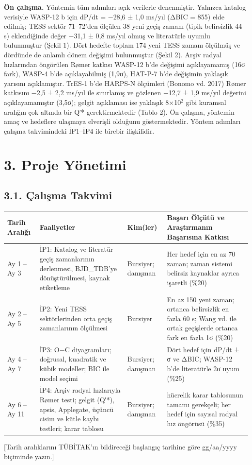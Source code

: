 \textbf{Ön çalışma.} Yöntemin tüm adımları açık verilerle denenmiştir. Yalnızca katalog verisiyle WASP-12 b için dP/dt = −28,6 ± 1,0 ms/yıl (ΔBIC = 855) elde edilmiş; TESS sektör 71–72'den ölçülen 38 yeni geçiş zamanı (tipik belirsizlik 44 s) eklendiğinde değer −31,1 ± 0,8 ms/yıl olmuş ve literatürle uyumlu bulunmuştur (Şekil 1). Dört hedefte toplam 174 yeni TESS zamanı ölçülmüş ve dördünde de anlamlı dönem değişimi bulunmuştur (Şekil 2). Arşiv radyal hızlarından öngörülen Rømer katkısı WASP-12 b'de değişimi açıklayamamış (16σ fark), WASP-4 b'de açıklayabilmiş (1,9σ), HAT-P-7 b'de değişimin yaklaşık yarısını açıklamıştır. TrES-1 b'de HARPS-N ölçümleri (Bonomo vd. 2017) Rømer katkısını −2,5 ± 2,2 ms/yıl ile sınırlamış ve gözlenen −12,7 ± 1,9 ms/yıl değerini açıklayamamıştır (3,5σ); gelgit açıklaması ise yaklaşık 8×10$^2$ gibi kuramsal aralığın çok altında bir Q′* gerektirmektedir (Tablo 2). Ön çalışma, yöntemin amaç ve hedeflere ulaşmaya elverişli olduğunu göstermektedir. Yöntem adımları çalışma takvimindeki İP1–İP4 ile birebir ilişkilidir.

\section*{3. Proje Yönetimi}
\subsection*{3.1. Çalışma Takvimi}
\begin{center}
\small
\begin{tabularx}{\textwidth}{l >{\raggedright\arraybackslash}X l >{\raggedright\arraybackslash}X}
\toprule
Tarih Aralığı & Faaliyetler & Kim(ler) & Başarı Ölçütü ve Araştırmanın Başarısına Katkısı\\
\midrule
Ay 1 – Ay 3 & İP1: Katalog ve literatür geçiş zamanlarının derlenmesi, BJD\_TDB'ye dönüştürülmesi, kaynak etiketleme & Bursiyer; danışman & Her hedef için en az 70 zaman; zaman sistemi belirsiz kaynaklar ayrıca işaretli (\%20)\\
Ay 2 – Ay 5 & İP2: Yeni TESS sektörlerinden orta geçiş zamanlarının ölçülmesi & Bursiyer & En az 150 yeni zaman; ortanca belirsizlik en fazla 60 s; Wang vd. ile ortak geçişlerde ortanca fark en fazla 1σ (\%20)\\
Ay 4 – Ay 7 & İP3: O$-$C diyagramları; doğrusal, kuadratik ve kübik modeller; BIC ile model seçimi & Bursiyer; danışman & Dört hedef için dP/dt ± σ ve ΔBIC; WASP-12 b'de literatürle 2σ uyum (\%25)\\
Ay 6 – Ay 11 & İP4: Arşiv radyal hızlarıyla Rømer testi; gelgit (Q′*), apsis, Applegate, üçüncü cisim ve kütle kaybı testleri; karar tablosu & Bursiyer; danışman & 24 hücrelik karar tablosunun tamamı gerekçeli; her hedef için sayısal radyal hız öngörüsü (\%35)\\
\bottomrule
\end{tabularx}
\end{center}
{\small [Tarih aralıklarını TÜBİTAK'ın bildireceği başlangıç tarihine göre gg/aa/yyyy biçiminde yazın.]}

